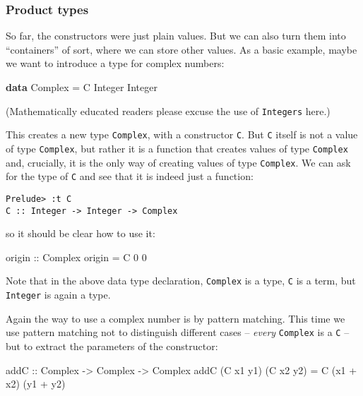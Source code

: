 \documentclass[11pt,
  american,
  DIV13]{article}
\newenvironment{Shaded}{}{}
\newcommand{\DataTypeTok}[1]{\textcolor[rgb]{0.56,0.13,0.00}{#1}}
\newcommand{\DecValTok}[1]{\textcolor[rgb]{0.25,0.63,0.44}{#1}}
\newcommand{\KeywordTok}[1]{\textcolor[rgb]{0.00,0.44,0.13}{\textbf{#1}}}
\newcommand{\NormalTok}[1]{#1}
\newcommand{\OperatorTok}[1]{\textcolor[rgb]{0.40,0.40,0.40}{#1}}
\newcommand{\OtherTok}[1]{\textcolor[rgb]{0.00,0.44,0.13}{#1}}
\begin{document}
\hypertarget{product-types}{%
\subsubsection{Product types}\label{product-types}}

So far, the constructors were just plain values. But we can also turn
them into ``containers'' of sort, where we can store other values. As a
basic example, maybe we want to introduce a type for complex numbers:

\begin{Shaded}
\begin{Highlighting}[]
\KeywordTok{data} \DataTypeTok{Complex} \OtherTok{=} \DataTypeTok{C} \DataTypeTok{Integer} \DataTypeTok{Integer}
\end{Highlighting}
\end{Shaded}

(Mathematically educated readers please excuse the use of
\texttt{Integers} here.)

This creates a new type \texttt{Complex}, with a constructor \texttt{C}.
But \texttt{C} itself is not a value of type \texttt{Complex}, but
rather it is a function that creates values of type \texttt{Complex}
and, crucially, it is the only way of creating values of type
\texttt{Complex}. We can ask for the type of \texttt{C} and see that it
is indeed just a function:

\begin{verbatim}
Prelude> :t C
C :: Integer -> Integer -> Complex
\end{verbatim}

so it should be clear how to use it:

\begin{Shaded}
\begin{Highlighting}[]
\OtherTok{origin ::} \DataTypeTok{Complex}
\NormalTok{origin }\OtherTok{=} \DataTypeTok{C} \DecValTok{0} \DecValTok{0}
\end{Highlighting}
\end{Shaded}

Note that in the above data type declaration, \texttt{Complex} is a
type, \texttt{C} is a term, but \texttt{Integer} is again a type.

Again the way to use a complex number is by pattern matching. This time
we use pattern matching not to distinguish different cases --
\emph{every} \texttt{Complex} is a \texttt{C} -- but to extract the
parameters of the constructor:

\begin{Shaded}
\begin{Highlighting}[]
\OtherTok{addC ::} \DataTypeTok{Complex} \OtherTok{{-}\textgreater{}} \DataTypeTok{Complex} \OtherTok{{-}\textgreater{}} \DataTypeTok{Complex}
\NormalTok{addC (}\DataTypeTok{C}\NormalTok{ x1 y1) (}\DataTypeTok{C}\NormalTok{ x2 y2) }\OtherTok{=} \DataTypeTok{C}\NormalTok{ (x1 }\OperatorTok{+}\NormalTok{ x2) (y1 }\OperatorTok{+}\NormalTok{ y2)}
\end{Highlighting}
\end{Shaded}
\end{document}
